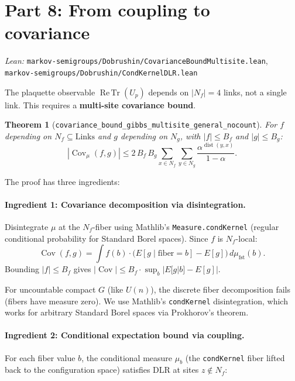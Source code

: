 \documentclass[11pt,a4paper]{article}
\newtheorem{theorem}{Theorem}
\theoremstyle{definition}
\newcommand{\ReTr}{\operatorname{Re\,Tr}}
\newcommand{\Cov}{\operatorname{Cov}}
\begin{document}
\section{Part 8: From coupling to covariance}

\textit{Lean:} \texttt{markov-semigroups/Dobrushin/CovarianceBoundMultisite.lean},
\texttt{markov-semigroups/Dobrushin/CondKernelDLR.lean}

\medskip

The plaquette observable $\ReTr(U_p)$ depends on $|N_f| = 4$ links,
not a single link. This requires a \textbf{multi-site covariance
bound}.

\begin{theorem}[\texttt{covariance\_bound\_gibbs\_multisite\_general\_nocount}]
For $f$ depending on $N_f \subseteq \text{Links}$ and $g$ depending
on $N_g$, with $|f| \leq B_f$ and $|g| \leq B_g$:
\[
  |\Cov_\mu(f, g)| \leq 2\, B_f\, B_g
  \sum_{x \in N_f} \sum_{y \in N_g}
  \frac{\alpha^{\operatorname{dist}(y, x)}}{1 - \alpha}.
\]
\end{theorem}

The proof has three ingredients:

\paragraph{Ingredient 1: Covariance decomposition via disintegration.}
Disintegrate $\mu$ at the $N_f$-fiber using Mathlib's
\texttt{Measure.condKernel} (regular conditional probability for
Standard Borel spaces). Since $f$ is $N_f$-local:
\[
  \Cov(f, g)
  = \int f(b) \cdot \bigl(E[g \mid \text{fiber} = b]
    - E[g]\bigr) \, d\mu_{\text{fst}}(b).
\]
Bounding $|f| \leq B_f$ gives
$|\Cov| \leq B_f \cdot \sup_b |E[g|b] - E[g]|$.

For uncountable compact $G$ (like $U(n)$), the discrete fiber
decomposition fails (fibers have measure zero). We use Mathlib's
\texttt{condKernel} disintegration, which works for arbitrary
Standard Borel spaces via Prokhorov's theorem.

\paragraph{Ingredient 2: Conditional expectation bound via coupling.}
For each fiber value $b$, the conditional measure $\mu_b$ (the
\texttt{condKernel} fiber lifted back to the configuration space)
satisfies DLR at sites $z \notin N_f$:
\end{document}
